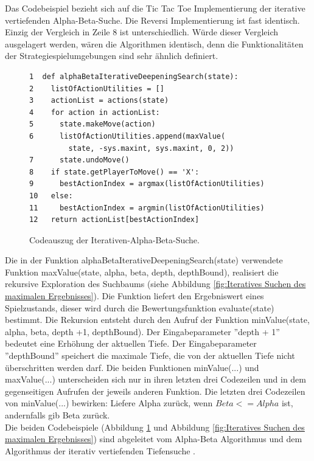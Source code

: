 Das Codebeispiel bezieht sich auf die Tic Tac Toe Implementierung der iterative vertiefenden Alpha-Beta-Suche. Die Reversi Implementierung ist fast identisch. Einzig der Vergleich in Zeile 8 ist unterschiedlich. Würde dieser Vergleich ausgelagert werden, wären die Algorithmen identisch, denn die Funktionalitäten der Strategiespielumgebungen sind sehr ähnlich definiert. \\

\begin{figure}[!htbp]
\centering
\begin{lstlisting}[frame=single, mathescape=true]
1  def alphaBetaIterativeDeepeningSearch(state):
2    listOfActionUtilities = []
3    actionList = actions(state)
4    for action in actionList:
5      state.makeMove(action)
6      listOfActionUtilities.append(maxValue(
         state, -sys.maxint, sys.maxint, 0, 2))
7      state.undoMove()
8    if state.getPlayerToMove() == 'X':
9      bestActionIndex = argmax(listOfActionUtilities)
10   else:
11     bestActionIndex = argmin(listOfActionUtilities)
12   return actionList[bestActionIndex]
\end{lstlisting}
\caption{Codeauszug der Iterativen-Alpha-Beta-Suche.}
\label{fig:Alpha-Beta iterativ vertiefende Suche}
\end{figure} 
\newpage

Die in der Funktion alphaBetaIterativeDeepeningSearch(state) verwendete Funktion maxValue(state, alpha, beta, depth, depthBound), realisiert die rekursive Exploration des Suchbaums (siehe Abbildung \ref{fig:Iteratives Suchen des maximalen Ergebnisses}). Die Funktion liefert den Ergebniswert eines Spielzustands, dieser wird durch die Bewertungsfunktion evaluate(state) bestimmt. Die Rekursion entsteht durch den Aufruf der Funktion minValue(state, alpha, beta, depth +1, depthBound). Der Eingabeparameter ''depth + 1'' bedeutet eine Erhöhung der aktuellen Tiefe. Der Eingabeparameter ''depthBound'' speichert die maximale Tiefe, die von der aktuellen Tiefe nicht überschritten werden darf. Die beiden Funktionen minValue(...) und maxValue(...) unterscheiden sich nur in ihren letzten drei Codezeilen und in dem gegenseitigen Aufrufen der jeweils anderen Funktion. Die letzten drei Codezeilen von minValue(...) bewirken: Liefere Alpha zurück, wenn $Beta <= Alpha$ ist, andernfalls gib Beta zurück. \\

Die beiden Codebeispiele (Abbildung \ref{fig:Alpha-Beta iterativ vertiefende Suche} und Abbildung \ref{fig:Iteratives Suchen des maximalen Ergebnisses}) sind abgeleitet vom Alpha-Beta Algorithmus \cite[214 \psq]{Russell} und dem Algorithmus der iterativ vertiefenden Tiefensuche \cite[124]{Russell}.\\

